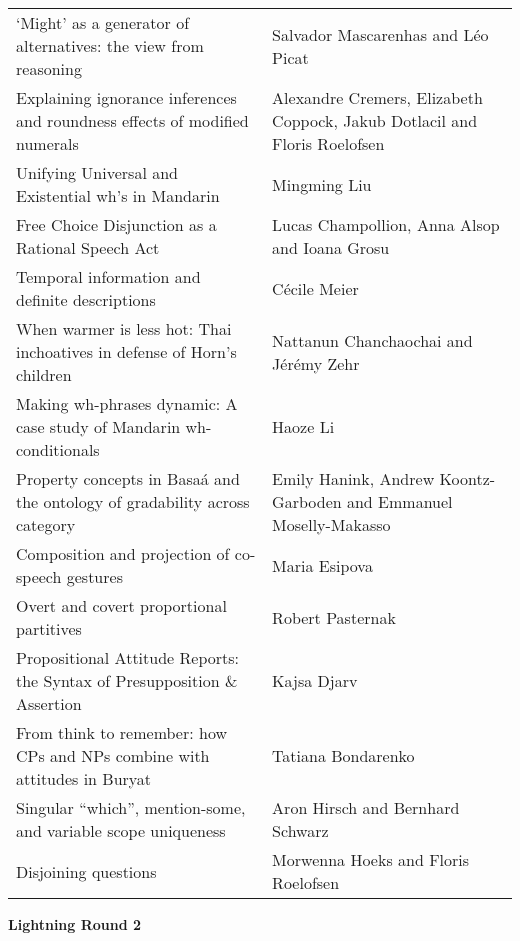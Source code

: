 \documentclass{article}
\begin{document}
\begin{longtable}{@{}T>{\raggedright\arraybackslash}p{3.5in}}
`Might' as a generator of alternatives: the view from reasoning&
Salvador Mascarenhas and L\'{e}o Picat\\
Explaining ignorance inferences and roundness effects of modified numerals&
Alexandre Cremers, Elizabeth Coppock, Jakub Dotlacil and Floris Roelofsen\\
%
Unifying Universal and Existential wh's in Mandarin&
Mingming Liu\\
%
Free Choice Disjunction as a Rational Speech Act&
Lucas Champollion, Anna Alsop and Ioana Grosu\\
%
Temporal information and definite descriptions&
Cécile Meier\\
When warmer is less hot: Thai inchoatives in defense of Horn's children&
Nattanun Chanchaochai and J\'er\'emy Zehr\\
Making wh-phrases dynamic: A case study of Mandarin wh-conditionals&
Haoze  Li\\
Property concepts in Basa\'a and the ontology of gradability across category&
Emily Hanink, Andrew Koontz-Garboden and Emmanuel Moselly-Makasso\\
Composition and projection of co-speech gestures&
Maria Esipova\\
Overt and covert proportional partitives&
Robert Pasternak\\
Propositional Attitude Reports: the Syntax of Presupposition \& Assertion&
Kajsa Djarv\\
From think to remember: how CPs and NPs combine with attitudes in Buryat&
Tatiana Bondarenko\\
Singular ``which'', mention-some, and variable scope uniqueness&
Aron Hirsch and Bernhard Schwarz\\
Disjoining questions&
Morwenna Hoeks and Floris Roelofsen
\end{longtable}

\bigskip
\bigskip

\textbf{Lightning Round 2}
\end{document}
